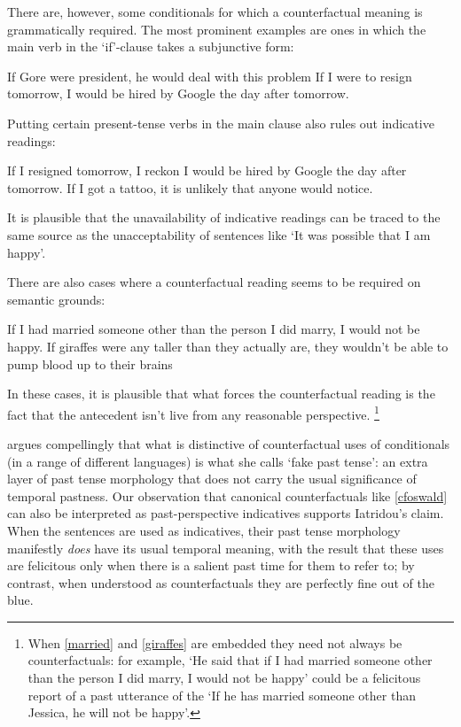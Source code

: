 \documentclass[If.tex]{subfiles}
\begin{document}
There are, however, some conditionals for which a counterfactual meaning is grammatically required. The most prominent examples are ones in which the main verb in the ‘if’-clause takes a subjunctive form:
\begin{prop}
	\nitem 
		If Gore were president, he would deal with this problem
	\nitem 
		If I were to resign tomorrow, I would be hired by Google the day after tomorrow.
\end{prop}
Putting certain present-tense verbs in the main clause also rules out indicative readings:
\begin{prop}
	\nitem 
		If I resigned tomorrow, I reckon I would be hired by Google the day after tomorrow.
	\nitem 
		If I got a tattoo, it is unlikely that anyone would notice.
\end{prop}
It is plausible that the unavailability of indicative readings can be traced to the same source as the unacceptability of sentences like ‘It was possible that I am happy’.

There are also cases where a counterfactual reading seems to be required on semantic grounds:
\begin{prop}
	\nitem \label{married}
		If I had married someone other than the person I did marry, I would not be happy.
	\nitem \label{giraffes}
		If giraffes were any taller than they actually are, they wouldn't be able to pump blood up to their brains
\end{prop}
In these cases, it is plausible that what forces the counterfactual reading is the fact that the antecedent isn't live from any reasonable perspective.%
\footnote{When \ref{married} and \ref{giraffes} are embedded they need not always be counterfactuals: for example, ‘He said that if I had married someone other than the person I did marry, I would not be happy’ could be a felicitous report of a past utterance of the ‘If he has married someone other than Jessica, he will not be happy’.}

\citet{IatridouGIC} argues compellingly that what is distinctive of counterfactual uses of conditionals (in a range of different languages) is what she calls ‘fake past tense’: an extra layer of past tense morphology that does not carry the usual significance of temporal pastness.  Our observation that canonical counterfactuals like \ref{cfoswald} can also be interpreted as past-perspective indicatives supports Iatridou's claim.  When the sentences are used as indicatives, their past tense morphology manifestly \emph{does} have its usual temporal meaning, with the result that these uses are felicitous only when there is a salient past time for them to refer to; by contrast, when understood as counterfactuals they are perfectly fine out of the blue.  
\end{document}
